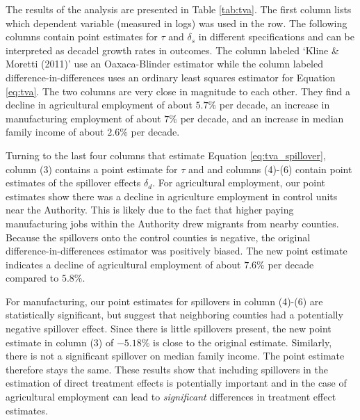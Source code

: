\documentclass[11pt]{article}
\begin{document}
The results of the analysis are presented in Table \ref{tab:tva}. The first column lists which dependent variable (measured in logs) was used in the row. The following columns contain point estimates for $\tau$ and $\delta_s$ in different specifications and can be interpreted as decadel growth rates in outcomes. The column labeled `Kline \& Moretti (2011)' use an Oaxaca-Blinder estimator while the column labeled difference-in-differences uses an ordinary least squares estimator for Equation \ref{eq:tva}. The two columns are very close in magnitude to each other. They find a decline in agricultural employment of about $5.7\%$ per decade, an increase in manufacturing employment of about $7\%$ per decade, and an increase in median family income of about $2.6\%$ per decade. 

Turning to the last four columns that estimate Equation \ref{eq:tva_spillover}, column (3) contains a point estimate for $\tau$ and and columns (4)-(6) contain point estimates of the spillover effects $\delta_d$. For agricultural employment, our point estimates show there was a decline in agriculture employment in control units near the Authority. This is likely due to the fact that higher paying manufacturing jobs within the Authority drew migrants from nearby counties. Because the spillovers onto the control counties is negative, the original difference-in-differences estimator was positively biased. The new point estimate indicates a decline of agricultural employment of about $7.6\%$ per decade compared to $5.8\%$. 

For manufacturing, our point estimates for spillovers in column (4)-(6) are statistically significant, but suggest that neighboring counties had a potentially negative spillover effect. Since there is little spillovers present, the new point estimate in column (3) of $-5.18\%$ is close to the original estimate. Similarly, there is not a significant spillover on median family income. The point estimate therefore stays the same. These results show that including spillovers in the estimation of direct treatment effects is potentially important and in the case of agricultural employment can lead to \emph{significant} differences in treatment effect estimates. 







\newpage \printbibliography%
\end{document}
